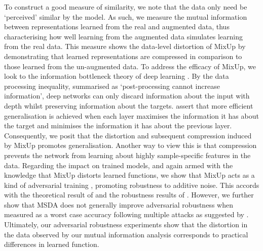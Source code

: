 \documentclass[journal]{IEEEtran}
\newcommand{\mixup}{MixUp\xspace}
\begin{document}
To construct a good measure of similarity, we note that the data only need be `perceived' similar by the model. As such, we measure the mutual information between representations learned from the real and augmented data, thus characterising how well learning from the augmented data simulates learning from the real data. This measure shows the data-level distortion of \mixup by demonstrating that learned representations are compressed in comparison to those learned from the un-augmented data. To address the efficacy of \mixup, we look to the information bottleneck theory of deep learning \citep{tishby2015deep}. By the data processing inequality, summarised as `post-processing cannot increase information', deep networks can only discard information about the input with depth whilst preserving information about the targets. \citet{tishby2015deep} assert that more efficient generalisation is achieved when each layer maximises the information it has about the target and minimises the information it has about the previous layer. Consequently, we posit that the distortion and subsequent compression induced by \mixup promotes generalisation. Another way to view this is that compression prevents the network from learning about highly sample-specific features in the data. Regarding the impact on trained models, and again armed with the knowledge that \mixup distorts learned functions, we show that \mixup acts as a kind of adversarial training \citep{goodfellow2014explaining}, promoting robustness to additive noise. This accords with the theoretical result of \citet{perrault-archambault2020mixup} and the robustness results of \citet{zhang2017mixup}. However, we further show that MSDA does not generally improve adversarial robustness when measured as a worst case accuracy following multiple attacks as suggested by \citet{carlini2019evaluating}. Ultimately, our adversarial robustness experiments show that the distortion in the data observed by our mutual information analysis corresponds to practical differences in learned function.
\end{document}
